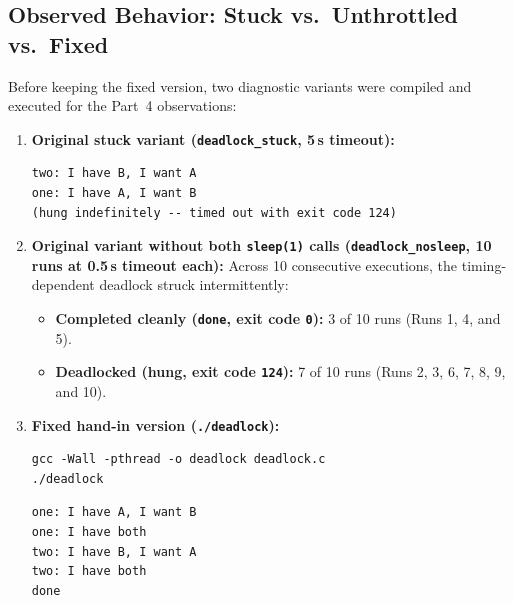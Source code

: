 \documentclass[12pt,a4paper]{article}
\begin{document}
\subsection{Observed Behavior: Stuck vs.\ Unthrottled vs.\ Fixed}
Before keeping the fixed version, two diagnostic variants were compiled and executed for the Part~4 observations:
\begin{enumerate}
    \item \textbf{Original stuck variant (\texttt{deadlock\_\allowbreak stuck}, 5\,s timeout):}
\begin{lstlisting}[style=consolestyle, caption={Observed deadlock with reversed lock order (\texttt{timeout 5}: exit code \texttt{124})}]
two: I have B, I want A
one: I have A, I want B
(hung indefinitely -- timed out with exit code 124)
\end{lstlisting}

    \item \textbf{Original variant without both \texttt{sleep(1)} calls (\texttt{deadlock\_\allowbreak nosleep}, 10 runs at 0.5\,s timeout each):}
    Across 10 consecutive executions, the timing-dependent deadlock struck intermittently:
    \begin{itemize}
        \item \textbf{Completed cleanly (\texttt{done}, exit code \texttt{0}):} 3 of 10 runs (Runs 1, 4, and 5).
        \item \textbf{Deadlocked (hung, exit code \texttt{124}):} 7 of 10 runs (Runs 2, 3, 6, 7, 8, 9, and 10).
    \end{itemize}

    \item \textbf{Fixed hand-in version (\texttt{./deadlock}):}
\begin{lstlisting}[style=bashstyle]
gcc -Wall -pthread -o deadlock deadlock.c
./deadlock
\end{lstlisting}
\begin{lstlisting}[style=consolestyle, caption={Observed output of fixed \texttt{./deadlock} (exited cleanly with code \texttt{0})}]
one: I have A, I want B
one: I have both
two: I have B, I want A
two: I have both
done
\end{lstlisting}
\end{enumerate}
\end{document}
